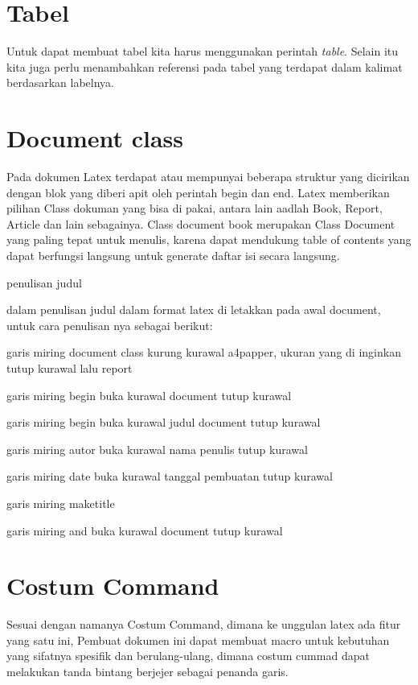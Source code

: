 \section{Tabel}
Untuk dapat membuat tabel kita harus menggunakan perintah \textit{table}. Selain itu kita juga perlu menambahkan referensi pada tabel yang terdapat dalam kalimat berdasarkan labelnya. 

\section{Document class}

Pada dokumen Latex terdapat atau mempunyai beberapa struktur yang dicirikan dengan blok yang diberi apit oleh perintah begin dan end. Latex memberikan pilihan Class dokuman yang bisa di pakai, antara lain aadlah Book, Report, Article dan lain sebagainya. Class document book merupakan Class Document yang paling tepat untuk menulis, karena dapat mendukung table of contents yang dapat berfungsi langsung untuk generate daftar isi secara langsung.

penulisan judul

dalam penulisan judul dalam format latex di letakkan pada awal document, untuk cara penulisan nya sebagai berikut:

garis miring document class kurung kurawal a4papper, ukuran yang di inginkan tutup kurawal lalu report

garis miring begin buka kurawal document tutup kurawal

garis miring begin buka kurawal judul document tutup kurawal

garis miring autor buka kurawal nama penulis tutup kurawal

garis miring date buka kurawal tanggal pembuatan tutup kurawal

garis miring maketitle

garis miring and buka kurawal document tutup kurawal

\section{Costum Command}
Sesuai  dengan  namanya Costum Command, dimana ke unggulan latex ada fitur yang satu ini,
Pembuat dokumen ini dapat  membuat macro untuk kebutuhan yang sifatnya spesifik dan berulang-ulang,
dimana costum cummad dapat melakukan tanda bintang berjejer sebagai penanda garis.



